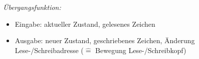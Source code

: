 \documentclass[aspectratio=1610,onlymath]{beamer}
\begin{document}
\begin{frame}
{\begin{tikzpicture}[
	scale=0.50,
	decoration=penciline, decorate
]
%
\end{tikzpicture}}
\bigskip\pause

\emph{Übergangsfunktion:}
\begin{itemize}
\item \alert{Eingabe:} aktueller Zustand, gelesenes Zeichen
\item \alert{Ausgabe:} neuer Zustand, geschriebenes Zeichen, Änderung Lese-/Schreibadresse (${}\hat{=}{}$ Bewegung Lese-/Schreibkopf)
\end{itemize}

\end{frame}
\end{document}
